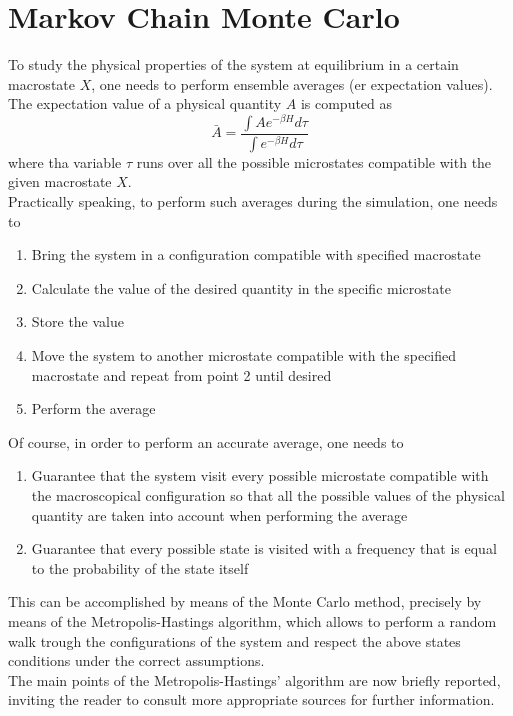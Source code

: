 \section{Markov Chain Monte Carlo}
To study the physical properties of the system at equilibrium in a certain macrostate $X$, one needs to perform ensemble averages (er expectation values). The expectation value of a physical quantity $A$ is computed as 
\begin{equation}
    \bar A = \frac{\int A e^{-\beta H} d\tau}{\int e^{-\beta H} d \tau}
    \label{eq:averageval}
\end{equation}
where tha variable $\tau$ runs over all the possible microstates compatible with the given macrostate $X$. \\
Practically speaking, to perform such averages during the simulation, one needs to
\begin{enumerate}
    \item Bring the system in a configuration compatible with specified macrostate 
    \item Calculate the value of the desired quantity in the specific microstate 
    \item Store the value
    \item Move the system to another microstate compatible with the specified macrostate and repeat from point 2 until desired
    \item Perform the average
\end{enumerate}
Of course, in order to perform an accurate average, one needs to 
\begin{enumerate}
    \item Guarantee that the system visit every possible microstate compatible with the macroscopical configuration so that all the possible values of the physical quantity are taken into account when performing the average
    \item Guarantee that every possible state is visited with a frequency that is equal to the probability of the state itself
\end{enumerate}
This can be accomplished by means of the Monte Carlo method, precisely by means of the Metropolis-Hastings algorithm, which allows to perform a random walk trough the configurations of the system and respect the above states conditions under the correct assumptions. \\
The main points of the Metropolis-Hastings' algorithm are now briefly reported, inviting the reader to consult more appropriate sources for further information. \\
